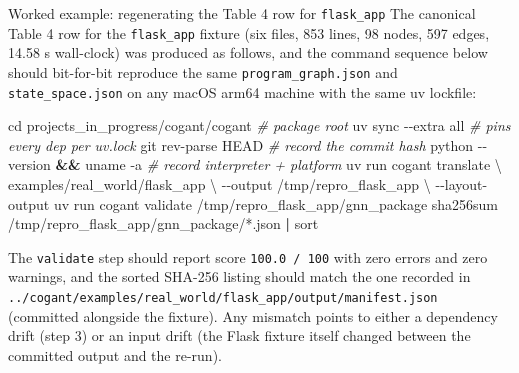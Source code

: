 \documentclass[
  ignorenonframetext,
]{beamer}
\newenvironment{Shaded}{}{}
\newcommand{\AttributeTok}[1]{\textcolor[rgb]{0.49,0.56,0.16}{#1}}
\newcommand{\BuiltInTok}[1]{\textcolor[rgb]{0.00,0.50,0.00}{#1}}
\newcommand{\CommentTok}[1]{\textcolor[rgb]{0.38,0.63,0.69}{\textit{#1}}}
\newcommand{\DataTypeTok}[1]{\textcolor[rgb]{0.56,0.13,0.00}{#1}}
\newcommand{\ExtensionTok}[1]{#1}
\newcommand{\FunctionTok}[1]{\textcolor[rgb]{0.02,0.16,0.49}{#1}}
\newcommand{\KeywordTok}[1]{\textcolor[rgb]{0.00,0.44,0.13}{\textbf{#1}}}
\newcommand{\NormalTok}[1]{#1}
\newcommand{\PreprocessorTok}[1]{\textcolor[rgb]{0.74,0.48,0.00}{#1}}
\begin{document}
\begin{frame}[fragile]{Worked example: regenerating the Table 4 row for
\texttt{flask\_app}}
\protect{}\label{worked-example-regenerating-the-table-4-row-for-flask_app}
The canonical Table 4 row for the \texttt{flask\_app} fixture (six
files, 853 lines, 98 nodes, 597 edges, 14.58 s wall-clock) was produced
as follows, and the command sequence below should bit-for-bit reproduce
the same \texttt{program\_graph.json} and \texttt{state\_space.json} on
any macOS arm64 machine with the same uv lockfile:

\begin{Shaded}
\begin{Highlighting}[]
\BuiltInTok{cd}\NormalTok{ projects\_in\_progress/cogant/cogant           }\CommentTok{\# package root}
\ExtensionTok{uv}\NormalTok{ sync }\AttributeTok{{-}{-}extra}\NormalTok{ all                               }\CommentTok{\# pins every dep per uv.lock}
\FunctionTok{git}\NormalTok{ rev{-}parse HEAD                                }\CommentTok{\# record the commit hash}
\ExtensionTok{python} \AttributeTok{{-}{-}version} \KeywordTok{\&\&} \FunctionTok{uname} \AttributeTok{{-}a}                      \CommentTok{\# record interpreter + platform}
\ExtensionTok{uv}\NormalTok{ run cogant translate }\DataTypeTok{\textbackslash{}}
\NormalTok{    examples/real\_world/flask\_app }\DataTypeTok{\textbackslash{}}
    \AttributeTok{{-}{-}output}\NormalTok{ /tmp/repro\_flask\_app }\DataTypeTok{\textbackslash{}}
    \AttributeTok{{-}{-}layout{-}output}
\ExtensionTok{uv}\NormalTok{ run cogant validate /tmp/repro\_flask\_app/gnn\_package}
\FunctionTok{sha256sum}\NormalTok{ /tmp/repro\_flask\_app/gnn\_package/}\PreprocessorTok{*}\NormalTok{.json }\KeywordTok{|} \FunctionTok{sort}
\end{Highlighting}
\end{Shaded}

The \texttt{validate} step should report score \texttt{100.0\ /\ 100}
with zero errors and zero warnings, and the sorted SHA-256 listing
should match the one recorded in
\texttt{../cogant/examples/real\_world/flask\_app/output/manifest.json}
(committed alongside the fixture). Any mismatch points to either a
dependency drift (step 3) or an input drift (the Flask fixture itself
changed between the committed output and the re-run).
\end{frame}
\end{document}
